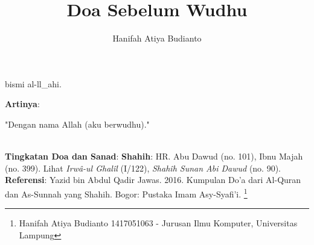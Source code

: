 \documentclass[a4paper,12pt]{article}
\title{\Large Doa Sebelum Wudhu}
\author{\calligra Hanifah Atiya Budianto}
\begin{document}
\sffamily
\maketitle 
\fullvocalize
{}
\begin{arabtext}
\noindent
bismi al-ll_ahi.\\
\end{arabtext}
\noindent
\textbf{Artinya}:
\par
\indent
"Dengan nama Allah (aku berwudhu)."\\\\
\par
\noindent
\textbf{Tingkatan Doa dan Sanad}: \textbf{Shahih}: HR. Abu Dawud (no. 101),
Ibnu Majah (no. 399). Lihat \textit{Irw\^{a}-ul Ghal\^{i}l} (I/122), 
\textit{Shah\^{i}h Sunan Abi Dawud} (no. 90). \\
\textbf{Referensi}: Yazid bin Abdul Qadir Jawas. 2016. Kumpulan Do'a dari
Al-Quran dan As-Sunnah yang Shahih. Bogor: Pustaka Imam Asy-Syafi'i.
\footnote{Hanifah Atiya Budianto 1417051063 - Jurusan Ilmu Komputer,
Universitas Lampung}
\end{document}
